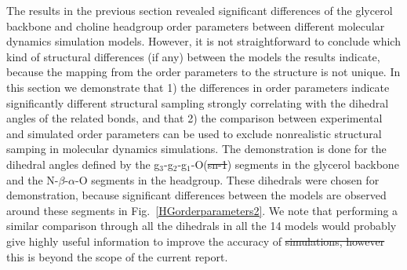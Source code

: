 \documentclass[pre,aps,floatfix,authordate1-4,twocolumn]{revtex4-1}
\providecommand{\DIFadd}[1]{{\protect\color{blue}\uwave{#1}}} %
\providecommand{\DIFdel}[1]{{\protect\color{red}\sout{#1}}}                      %
\providecommand{\DIFaddbegin}{} %
\providecommand{\DIFaddend}{} %
\providecommand{\DIFdelbegin}{} %
\providecommand{\DIFdelend}{} %
\begin{document}
The results in the previous section revealed significant differences of the glycerol backbone and choline headgroup
order parameters between different molecular dynamics simulation models.
However, it is not straightforward to conclude which kind of structural differences (if any)
between the models the results indicate, because the mapping from the order parameters to the 
structure is not unique. In this section we demonstrate that 1) the differences in order parameters
indicate significantly different structural sampling strongly correlating with the dihedral angles of the related bonds,
and that 2) the comparison between experimental and simulated order parameters can be used to exclude
nonrealistic structural samping in molecular dynamics simulations. The demonstration is done for 
the dihedral angles defined by the g$_3$-g$_2$-g$_1$-O(\DIFdelbegin \DIFdel{sn-1}\DIFdelend \DIFaddbegin \textit{\DIFadd{sn}}\DIFadd{-1}\DIFaddend ) segments in the glycerol backbone and 
the N-$\beta$-$\alpha$-O segments in the headgroup. These dihedrals were chosen for demonstration, because 
significant differences between the models are observed around these segments in Fig.~\ref{HGorderparameters2}.
We note that performing a similar comparison through all the dihedrals in all the 14 models would probably give highly useful
information \DIFaddbegin \DIFadd{on how }\DIFaddend to improve the accuracy of \DIFdelbegin \DIFdel{simulations, however }\DIFdelend \DIFaddbegin \DIFadd{the models yet }\DIFaddend this is beyond the scope of the current report. 
\end{document}
